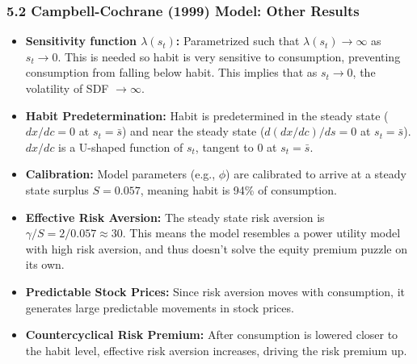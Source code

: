 \documentclass{beamer}
\begin{document}
\begin{frame}
    \frametitle{5.2 Campbell-Cochrane (1999) Model: Other Results}
    \begin{itemize}
        \item \textbf{Sensitivity function $\lambda(s_t)$:} Parametrized such that $\lambda(s_t) \to \infty$ as $s_t \to 0$. This is needed so habit is very sensitive to consumption, preventing consumption from falling below habit. This implies that as $s_t \to 0$, the volatility of SDF $\to \infty$.
        \item \textbf{Habit Predetermination:} Habit is predetermined in the steady state ($dx/dc = 0$ at $s_t = \bar{s}$) and near the steady state ($d(dx/dc)/ds = 0$ at $s_t = \bar{s}$). $dx/dc$ is a U-shaped function of $s_t$, tangent to 0 at $s_t = \bar{s}$.
        \item \textbf{Calibration:} Model parameters (e.g., $\phi$) are calibrated to arrive at a steady state surplus $S = 0.057$, meaning habit is 94\% of consumption.
        \item \textbf{Effective Risk Aversion:} The steady state risk aversion is $\gamma/S = 2/0.057 \approx 30$. This means the model resembles a power utility model with high risk aversion, and thus doesn't solve the equity premium puzzle on its own.
        \item \textbf{Predictable Stock Prices:} Since risk aversion moves with consumption, it generates large predictable movements in stock prices.
        \item \textbf{Countercyclical Risk Premium:} After consumption is lowered closer to the habit level, effective risk aversion increases, driving the risk premium up.
    \end{itemize}
\end{frame}
\end{document}
